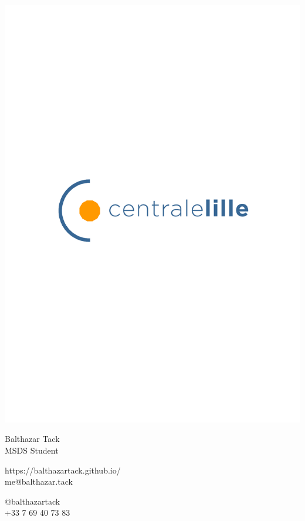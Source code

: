 \documentclass{article}
\begin{document}
\centering \includegraphics[width=.25\linewidth]{logo}\\[5pt]
\parbox{2in}{\Large \centering Balthazar Tack\\[1pt]
\normalsize MSDS Student}

\vfill
\raggedright
\begin{multicols}{2}
https://balthazartack.github.io/\\
me@balthazar.tack

\columnbreak
\raggedleft
@balthazartack\\
+33 7 69 40 73 83%
\end{multicols}%
\end{document}
